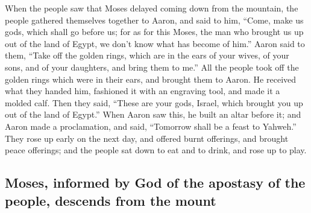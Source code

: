 \begin{paracol}{2}
\begin{otherlanguage}{english}
 When the people saw that Moses delayed coming down from
the mountain, the people gathered themselves together to Aaron, and said
to him, ``Come, make us gods, which shall go before us; for as for this
Moses, the man who brought us up out of the land of Egypt, we don't know
what has become of him.''  Aaron said to them, ``Take off
the golden rings, which are in the ears of your wives, of your sons, and
of your daughters, and bring them to me.''  All the people
took off the golden rings which were in their ears, and brought them to
Aaron.  He received what they handed him, fashioned it
with an engraving tool, and made it a molded calf. Then they said,
``These are your gods, Israel, which brought you up out of the land of
Egypt.''  When Aaron saw this, he built an altar before
it; and Aaron made a proclamation, and said, ``Tomorrow shall be a feast
to Yahweh.''  They rose up early on the next day, and
offered burnt offerings, and brought peace offerings; and the people sat
down to eat and to drink, and rose up to play.

\hypertarget{moses-informed-by-god-of-the-apostasy-of-the-people-descends-from-the-mount}{%
\subsection{Moses, informed by God of the apostasy of the people,
descends from the
mount}\label{moses-informed-by-god-of-the-apostasy-of-the-people-descends-from-the-mount}}


\end{otherlanguage}
\end{paracol}
